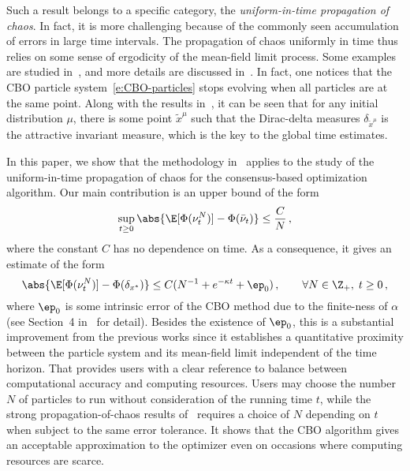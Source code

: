 \documentclass{amsart}
\begin{document}
Such a result belongs to a specific category, the \emph{uniform-in-time propagation of chaos}.
In fact, it is more challenging because of the commonly seen accumulation of errors in large time intervals.
The propagation of chaos uniformly in time thus relies on some sense of ergodicity of the mean-field limit process. 
Some examples are studied in~\cite{Malrieu2001,Malrieu2003,GuillinLebrisMonmarche2023,RosenzweigSerfaty2023,Lacker2021,LackerFlem2023}, and more details are discussed in~\cite{DelarueTse2021}.
In fact, one notices that the CBO particle system~\eqref{e:CBO-particles} stops evolving when all particles are at the same point. 
Along with the results in~\cite{CarriloChoiTotzeckTse2018,FornasierKlockRiedl2021}, it can be seen that for any initial distribution $\mu$, there is some point $\tilde x^\mu$ such that the Dirac-delta measures $\delta_{\tilde x^\mu}$ is the attractive invariant measure, which is the key to the global time estimates. 


In this paper, we show that the methodology in~\cite{DelarueTse2021} applies to the study of the uniform-in-time propagation of chaos for the consensus-based optimization algorithm. 
Our main contribution is an upper bound of the form 
\begin{equation*}
	\sup_{t \ge 0} \abs{\E[\Phi(\nu^N_t)] - \Phi(\bar \nu_t)} \le \frac CN \,,
\end{equation*}
where the constant $C$ has no dependence on time.  
As a consequence, it gives an estimate of the form 
\begin{equation*}
	\abs{\E[\Phi(\nu^N_t)] - \Phi(\delta_{x^\ast})} \le C (N^{-1} + e^{-\kappa t} + \ep_0) \,, \qquad \forall N \in \Z_+, \; t \ge 0 \,,
\end{equation*}
where $\ep_0$ is some intrinsic error of the CBO method due to the finite-ness of $\alpha$ (see Section~4 in~\cite{CarriloChoiTotzeckTse2018} for detail).
Besides the existence of $\ep_0$, this is a substantial improvement from the previous works since it establishes a quantitative proximity between the particle system and its mean-field limit independent of the time horizon.
That provides users with a clear reference to balance between computational accuracy and computing resources. 
Users may choose the number $N$ of particles to run without consideration of the running time $t$, while the strong propagation-of-chaos results of~\cite{HuangQiu2022,GerberHoffmannVaes2023} requires a choice of $N$ depending on $t$ when subject to the same error tolerance. 
It shows that the CBO algorithm gives an acceptable approximation to the optimizer even on occasions where computing resources are scarce.
\end{document}
